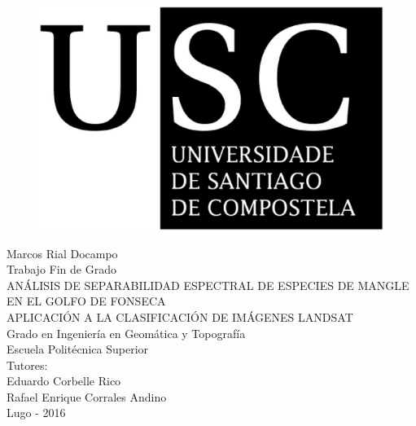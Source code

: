 




\begin{figure}[t]
\centering
\includegraphics[scale=0.15]{./Imagenes/USCbn.eps} %
\end{figure}

\begin{center}
\vspace*{2cm}
{\LARGE Marcos Rial Docampo}\\[2cm]
{\LARGE Trabajo Fin de Grado}\\[1cm]
{\LARGE ANÁLISIS DE SEPARABILIDAD ESPECTRAL DE ESPECIES DE MANGLE EN EL GOLFO DE FONSECA}\\
{\LARGE APLICACIÓN A LA CLASIFICACIÓN DE IMÁGENES LANDSAT}\\[2cm]
{\Large Grado en Ingeniería en Geomática y Topografía\\Escuela Politécnica Superior}\\[1cm]
{\Large \vfill{\normalsize{Tutores:\\Eduardo Corbelle Rico\\Rafael Enrique Corrales Andino}}}\\
{\footnotesize \vfill{Lugo - 2016}}
\end{center}